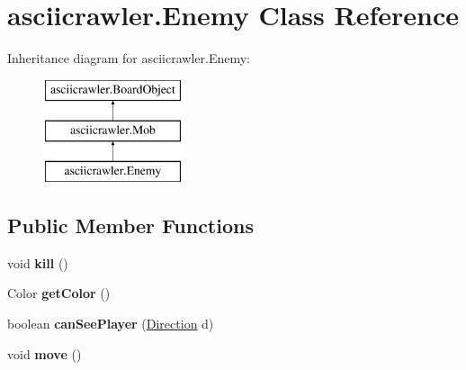 \hypertarget{classasciicrawler_1_1Enemy}{}\section{asciicrawler.\+Enemy Class Reference}
\label{classasciicrawler_1_1Enemy}
Inheritance diagram for asciicrawler.\+Enemy\+:\begin{figure}[H]
\begin{center}
\leavevmode
\includegraphics[height=3.000000cm]{classasciicrawler_1_1Enemy}
\end{center}
\end{figure}
\subsection*{Public Member Functions}
\begin{DoxyCompactItemize}
\item 
\mbox{\label{classasciicrawler_1_1Enemy_afe6ebef5eeb864014ca199659b075d49}} 
void {\bfseries kill} ()
\item 
\mbox{\label{classasciicrawler_1_1Enemy_a86551f4c55693124ea420002af778fdc}} 
Color {\bfseries get\+Color} ()
\item 
\mbox{\label{classasciicrawler_1_1Enemy_a278cb592e872c27a9faa8932f1c14819}} 
boolean {\bfseries can\+See\+Player} (\hyperlink{enumasciicrawler_1_1Direction}{Direction} d)
\item 
\mbox{\label{classasciicrawler_1_1Enemy_afde325bd1c572dd3ff925b335be6ab0e}} 
void {\bfseries move} ()
\end{DoxyCompactItemize}

